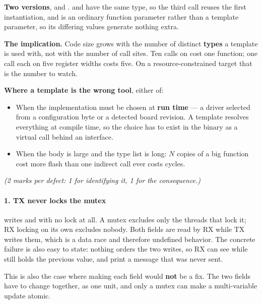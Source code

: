 \textbf{Two versions},  and .  and
 have the same type, so the third call reuses the first instantiation, and  is
an ordinary function parameter rather than a template parameter, so its differing values generate
nothing extra. 

\textbf{The implication.} Code size grows with the number of distinct \textbf{types} a template is
used with, not with the number of call sites. Ten calls on  cost one function;
one call each on five register widths costs five. On a resource-constrained target that is the
number to watch. 

\textbf{Where a template is the wrong tool}, either of: 
\begin{itemize}
  \item When the implementation must be chosen at \textbf{run time} --- a driver selected from a
    configuration byte or a detected board revision. A template resolves everything at compile time,
    so the choice has to exist in the binary as a virtual call behind an interface.
  \item When the body is large and the type list is long: $N$ copies of a big function cost more
    flash than one indirect call ever costs cycles.
\end{itemize}


\textit{(2 marks per defect: 1 for identifying it, 1 for the consequence.)}

\paragraph{1. TX never locks the mutex}
 writes  and  with no lock at all. A mutex
excludes only the threads that lock it; RX locking on its own excludes nobody. Both fields are read
by RX while TX writes them, which is a data race and therefore undefined behavior. The concrete
failure is also easy to state: nothing orders the two writes, so RX can see
 while  still holds the previous value, and print a message that
was never sent.

This is also the case where making each field  would \textbf{not} be a fix. The
two fields have to change together, as one unit, and only a mutex can make a multi-variable update
atomic.

